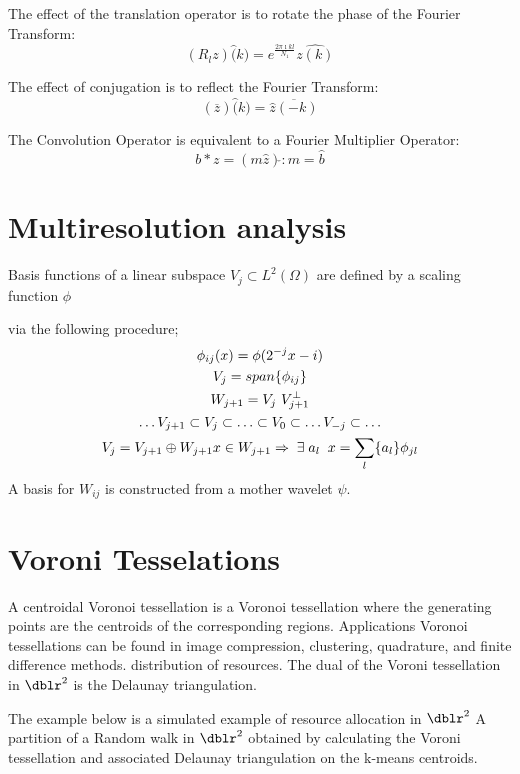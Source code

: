 The effect of the translation operator is to rotate the phase
of the Fourier Transform:
\begin{equation*}
(R_l z)\hat(k)=e^{ \frac{2 \pi \imath k l}{N_1}}\widehat{z(k)}
\end{equation*}

The effect of conjugation is to reflect the Fourier Transform:
\begin{equation*}
(\overline{z})\hat(k)=\overline{\hat z(-k)}
\end{equation*}


The Convolution Operator is equivalent to a Fourier Multiplier
Operator:
\begin{equation*}
b * z=(m \hat z )\check{} \! : m=\hat b
\end{equation*}

\section*{Multiresolution analysis} Basis functions of a linear
subspace $V_j \subset L^2(\Omega)$ are
defined by a scaling function $\phi$ 

via the following procedure;
\begin{gather*}
\phi_{ij}(x) = \phi(2^{-j} x-i)  \\
V_j = span \{ \phi_{ij} \} \\
W_{j+1}= V_j \ V_{j+1}^\bot \\
\hdots V_{j+1} \subset V_j \subset \hdots \subset V_0 \subset \hdots V_{-j}  \subset \hdots \\
V_j=V_{j+1} \oplus W_{j+1} x \in W_{j+1} \Rightarrow \; \exists \;
{a_l} \;\; x=\sum_l \{a_l\} \phi_{jl}
\end{gather*}
A basis for $W_{ij}$ is constructed from a mother wavelet
$\psi$.

\section*{Voroni Tesselations}
A centroidal Voronoi tessellation is a Voronoi tessellation where the
generating points are the centroids of the corresponding regions.
Applications Voronoi tessellations can be found in image compression,
clustering, quadrature, and finite difference methods. distribution of
resources.  The dual of the Voroni tessellation in $\dblr^2$ is the Delaunay
triangulation.

The example below is a simulated example of resource allocation in $\dblr^2$
A partition of a Random walk in $\dblr^2$ obtained by calculating the Voroni
tessellation and associated Delaunay triangulation on the k-means centroids.

